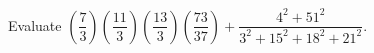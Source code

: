 Evaluate $\left(\dfrac{7}{3}\right)\left(\dfrac{11}{3}\right)\left(\dfrac{13}{3}\right)\left(\dfrac{73}{37}\right)+\dfrac{4^2+51^2}{3^2+15^2+18^2+21^2}$.

